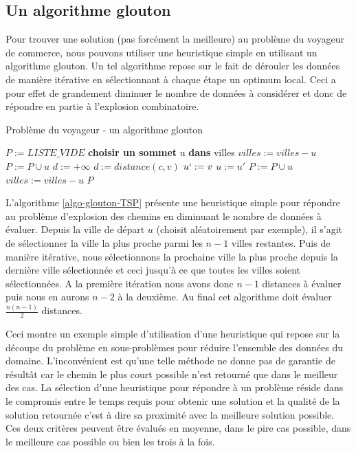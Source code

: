 \subsection{Un algorithme glouton}
Pour trouver une solution (pas forcément la meilleure) au problème du voyageur de commerce, nous pouvons utiliser une heuristique simple en utilisant un algorithme glouton. Un tel algorithme repose sur le fait de dérouler les données de manière itérative en sélectionnant à chaque étape un optimum local. Ceci a pour effet de grandement diminuer le nombre de données à considérer et donc de répondre en partie à l'explosion combinatoire.

\begin{algorithm}
\caption{Problème du voyageur - un algorithme glouton} 
\label{algo-glouton-TSP}
\begin{algorithmic}
    \State $P := LISTE\_VIDE$
    \State \textbf{choisir un sommet} u \textbf{dans} villes
    \State $villes := villes - u$
    \State $P := P \cup u$
        \State $d := +\infty$
                \State $d := distance(c, v)$
                \State $u` := v$
            \EndIf
        \EndFor
        \State $u := u'$
        \State $P := P \cup u$
        \State $villes := villes - u$
    \EndWhile
    \State \Return $P$
\EndFunction
\end{algorithmic}
\end{algorithm}

L'algorithme \ref{algo-glouton-TSP} présente une heuristique simple pour répondre au problème d'explosion des chemins en diminuant le nombre de données à évaluer.
Depuis la ville de départ $u$ (choisit aléatoirement par exemple), il s'agit de sélectionner la ville la plus proche parmi les $n-1$ villes restantes. Puis de manière itérative, nous sélectionnons la prochaine ville la plus proche depuis la dernière ville sélectionnée et ceci jusqu'à ce que toutes les villes soient sélectionnées. 
A la première itération nous avons donc $n-1$ distances à évaluer puis nous en aurons $n-2$ à la deuxième. Au final cet algorithme doit évaluer $\frac{n(n-1)}{2}$ distances. 

\newpage

Ceci montre un exemple simple d'utilisation d'une heuristique qui repose sur la découpe du problème en sous-problèmes pour réduire l'ensemble des données du domaine. L'inconvénient est qu'une telle méthode ne donne pas de garantie de résultât car le chemin le plus court possible n'est retourné que dans le meilleur des cas.
La sélection d'une heuristique pour répondre à un problème réside dans le compromis entre le temps requis pour obtenir une solution et la qualité de la solution retournée c'est à dire sa proximité avec la meilleure solution possible. 
Ces deux critères peuvent être évalués en moyenne, dans le pire cas possible, dans le meilleure cas possible ou bien les trois à la fois. \\

